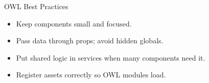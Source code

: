\begin{frame}{OWL Best Practices}
	\begin{itemize}
		\item Keep components small and focused.
		\item Pass data through props; avoid hidden globals.
		\item Put shared logic in services when many components need it.
		\item Register assets correctly so OWL modules load.
	\end{itemize}
\end{frame}
